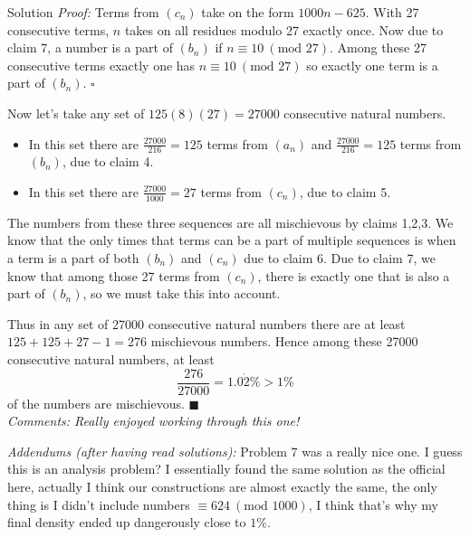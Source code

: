 \documentclass{article}
\begin{document}
\begin{solution}{Solution}
\textit{Proof:} Terms from $(c_n)$ take on the form $1000n - 625$.
With 27 consecutive terms, $n$ takes on all residues modulo 27 exactly once.
Now due to claim 7, a number is a part of $(b_n)$ if $n \equiv 10
\ (\text{mod } 27)$. Among these 27 consecutive terms exactly one
has $n \equiv 10 \ (\text{mod } 27)$ so exactly one term is a part of
$(b_n)$. $\square$
\\ \bigskip

Now let's take any set of $125(8)(27) = 27000$ consecutive natural numbers.
\begin{itemize}
\item In this set there are $\frac{27000}{216} = 125$ terms from $(a_n)$ and
$\frac{27000}{216} = 125$ terms from $(b_n)$, due to claim 4.
\item In this set there are $\frac{27000}{1000} = 27$ terms from $(c_n)$,
due to claim 5.
\end{itemize}
The numbers from these three sequences are all mischievous by claims 1,2,3.
We know that the only times that terms can be a part of multiple sequences
is when a term is a part of both $(b_n)$ and $(c_n)$ due to claim 6.
Due to claim 7, we know that among those 27 terms from $(c_n)$, there is
exactly one that is also a part of $(b_n)$, so we must take this into
account. \vspace{0.2cm}

Thus in any set of 27000 consecutive natural numbers there are at least
$125 + 125 + 27 - 1 = 276$ mischievous numbers.
Hence among these 27000 consecutive natural
numbers, at least
$$
\frac{276}{27000} = 1.0 \dot{2} \% > 1\%
$$
of the numbers are mischievous. $\blacksquare$
\\

\textit{Comments: Really enjoyed working through this one!}
\\

\hline
\vspace{0.2cm}

\textit{Addendums (after having read solutions):} Problem 7 was a really
nice one. I guess this is an analysis problem? I essentially found the
same solution as the official here, actually I think our constructions are
almost exactly the same, the only thing is I didn't include numbers
$\equiv 624 \ (\text{mod } 1000)$, I think that's why my final density
ended up dangerously close to $1 \%$.

\end{solution}
\newpage
\end{document}

